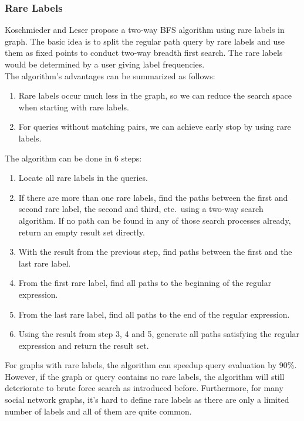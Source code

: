 \subsubsection{Rare Labels}
Koschmieder and Leser propose a two-way BFS algorithm using rare labels in graph\cite{koschmieder2012regular}. The basic idea is to split the regular path query by rare labels and use them as fixed points to conduct two-way breadth first search. The rare labels would be determined by a user giving label frequencies.\\
The algorithm's advantages can be summarized as follows:
\begin{enumerate}
\item Rare labels occur much less in the graph, so we can reduce the search space when starting with rare labels.
\item For queries without matching pairs, we can achieve early stop by using rare labels.
\end{enumerate}
The algorithm can be done in 6 steps:
\begin{enumerate}
\item Locate all rare labels in the queries.
\item If there are more than one rare labels, find the paths between the first and second rare label, the second and third, etc.\ using a two-way search algorithm. If no path can be found in any of those search processes already, return an empty result set directly.
\item With the result from the previous step, find paths between the first and the last rare label.
\item From the first rare label, find all paths to the beginning of the regular expression.
\item From the last rare label, find all paths to the end of the regular expression.
\item Using the result from step 3, 4 and 5, generate all paths satisfying the regular expression and return the result set.
\end{enumerate}
For graphs with rare labels, the algorithm can speedup query evaluation by 90\%. However, if the graph or query contains no rare labels, the algorithm will still deteriorate to brute force search as introduced before. Furthermore, for many social network graphs, it's hard to define rare labels as there are only a limited number of labels and all of them are quite common.
